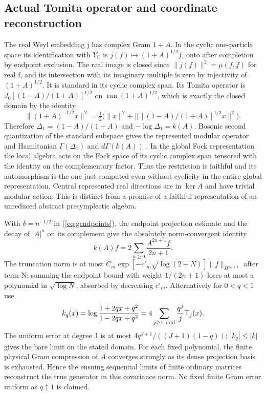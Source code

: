 \documentclass[11pt]{article}
\begin{document}
\subsection{Actual Tomita operator and coordinate reconstruction}
The real Weyl embedding j has complex Gram $1+A$. In the
cyclic one-particle space its identification with $Y_\mathbb C$
is $j(f)\mapsto (1+A)^{1/2} f$, onto after completion by
endpoint exclusion. The real image is closed since
$\|j(f)\|^2=\mu(f,f)$ for real f, and its intersection with its
imaginary multiple is zero by injectivity of $(1+A)^{1/2}$.
It is standard in its cyclic complex span. Its Tomita operator is
$J_0[(1-A)/(1+A)]^{1/2}$ on
$\operatorname{ran}(1+A)^{1/2}$, which is exactly the closed
domain by the identity
\[
 \|(1+A)^{-1/2}x\|^2
 =\tfrac12\bigl(\|x\|^2+
    \|[(1-A)/(1+A)]^{1/2}x\|^2\bigr).
\]
Therefore $\Delta_1=(1-A)/(1+A)$ and $-\log\Delta_1=k(A)$.
Bosonic second quantization of the standard subspace gives
the represented modular operator and Hamiltonian
$\Gamma(\Delta_1)$ and $d\Gamma(k(A))$ \cite{bgl,longo}.
In the global Fock representation the local algebra acts on
the Fock space of its cyclic complex span tensored with the
identity on the complementary factor. Thus the restriction is
faithful and its automorphism is the one just computed even
without cyclicity in the entire global representation. Central
represented real directions are in $\ker A$ and have trivial
modular action. This is distinct from a promise of a faithful
representation of an unreduced abstract presymplectic algebra.

With $\delta=n^{-1/2}$ in (\ref{eq:gendpoints}), the endpoint
projection estimate and the decay of $|A|^n$ on its complement
give the absolutely norm-convergent identity
\[
 k(A)f=2\sum_{n\ge0}\frac{A^{2n+1}f}{2n+1}.
\]
The truncation norm is at most
$C_m\exp[-c'_m\sqrt{\log(2+N)}]\|f\|_{H^{s_m+1}}$ after
term N: summing the endpoint bound with weight $1/(2n+1)$
loses at most a polynomial in $\sqrt{\log N}$, absorbed by
decreasing $c'_m$. Alternatively for $0<q<1$ use
\[
 k_q(x)=\log\frac{1+2qx+q^2}{1-2qx+q^2}
  =4\sum_{j\ge1\ {\rm odd}}\frac{q^j}{j}\mathsf T_j(x).
\]
The uniform error at degree J is at most
$4q^{J+1}/((J+1)(1-q))$; $|k_q|\le|k|$ gives the bare limit on
the stated domain. For each fixed polynomial, the finite physical
Gram compression of $A$ converges strongly as its dense
projection basis is exhausted. Hence the ensuing sequential
limits of finite ordinary matrices reconstruct the true generator
in this covariance norm. No fixed finite Gram error uniform
as $q\uparrow1$ is claimed.
\end{document}
